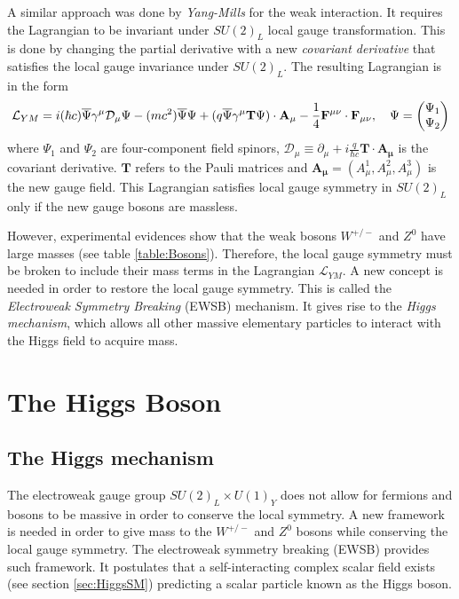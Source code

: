 A similar approach was done by \textit{Yang-Mills} for the weak interaction. It requires the Lagrangian to be invariant under $SU(2)_{L}$ local gauge transformation. This is done by changing the partial derivative with a new \textit{covariant derivative} that satisfies the local gauge invariance under $SU(2)_{L}$. The resulting Lagrangian is in the form \cite{Griffiths:343277}
\begin{equation}
  \mathcal{L}_{YM} = i(\hbar c)\overline{\rm \Psi}\gamma^{\mu}\mathcal{D}_{\mu}\Psi - (mc^2)\overline{\rm \Psi}\Psi + (q\overline{\rm \Psi}\gamma^{\mu}\mathbf{T}\Psi) \cdot \mathbf{A_{\mu}} - \frac{1}{4}\mathbf{F^{\mu\nu}} \cdot \mathbf{F_{\mu\nu}}, \quad \Psi = \begin{pmatrix} \Psi_1 \\ \Psi_2 \end{pmatrix}
\end{equation}
where $\Psi_1$ and $\Psi_2$ are four-component field spinors, $\mathcal{D}_{\mu} \equiv \partial_{\mu} + i\frac{q}{\hbar c}\mathbf{T} \cdot \mathbf{A_{\mu}}$ is the covariant derivative. $\mathbf{T}$ refers to the Pauli matrices and $\mathbf{A_{\mu}} = (A_{\mu}^1, A_{\mu}^2, A_{\mu}^3)$ is the new gauge field. This Lagrangian satisfies local gauge symmetry in $SU(2)_{L}$ only if the new gauge bosons are massless.

However, experimental evidences \cite{Rubbia:1983pta} show that the weak bosons $W^{+/-}$ and $Z^0$ have large masses (see table \ref{table:Bosons}). Therefore, the local gauge symmetry must be broken to include their mass terms in the Lagrangian $\mathcal{L}_{YM}$. A new concept is needed in order to restore the local gauge symmetry. This is called the \textit{Electroweak Symmetry Breaking} (EWSB) mechanism. It gives rise to the \textit{Higgs mechanism}, which allows all other massive elementary particles to interact with the Higgs field to acquire mass.

\section{The Higgs Boson}
\label{sec:HiggsTheo}

\subsection{The Higgs mechanism}
\label{subsec:HiggsMecha}

The electroweak gauge group $SU(2)_{L} \times U(1)_{Y}$ does not allow for fermions and bosons to be massive in order to conserve the local symmetry. A new framework is needed in order to give mass to the $W^{+/-}$ and $Z^0$ bosons while conserving the local gauge symmetry. The electroweak symmetry breaking (EWSB) provides such framework. It postulates that a self-interacting complex scalar field exists (see section \ref{sec:HiggsSM}) predicting a scalar particle known as the Higgs boson.

